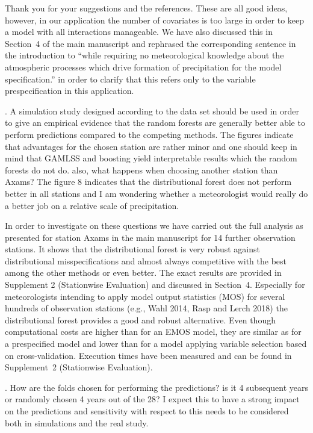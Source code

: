 \documentclass[american,foldmarks=false,noconfig]{uibklttr}
\newenvironment{review}{\fontshape{\itdefault}\fontseries{\bfdefault} \selectfont \smallskip}{\par}
\begin{document}
Thank you for your suggestions and the references. These are all
good ideas, however, in our application the number of covariates
is too large in order to keep a model with all interactions manageable.
We have also discussed this in Section~4 of the main manuscript and
rephrased the corresponding sentence in the introduction to ``while 
requiring no meteorological knowledge about the atmospheric processes 
which drive formation of precipitation for the model specification.'' 
in order to clarify that this refers only to the variable prespecification 
in this application.


\begin{review}
6. A simulation study designed according to the data set should 
be used in order to give an empirical evidence that the random 
forests are generally better able to perform predictions compared 
to the competing methods. The figures indicate that advantages 
for the chosen station are rather minor and one should keep in 
mind that GAMLSS and boosting yield interpretable results which 
the random forests do not do. also, what happens when choosing 
another station than Axams? The figure 8 indicates that the 
distributional forest does not perform better in all stations 
and I am wondering whether a meteorologist would really do a 
better job on a relative scale of precipitation.
\end{review}

In order to investigate on these questions we have carried out the full
analysis as presented for station Axams in the main manuscript for 14
further observation stations. It shows that the distributional
forest is very robust against distributional misspecifications
and almost always competitive with the best among the other methods 
or even better. The exact results are provided in 
Supplement 2 (Stationwise Evaluation) and discussed in Section~4. 
Especially for meteorologists intending to apply model output 
statistics (MOS) for several hundreds of observation stations 
(e.g., Wahl 2014, Rasp and Lerch 2018)
the distributional forest provides a good and robust alternative. 
Even though computational costs are higher than for an EMOS model, 
they are similar as for a prespecified model and lower than for 
a model applying variable selection based on cross-validation.
Execution times have been measured and can be found
in Supplement~2 (Stationwise Evaluation).



\begin{review}
7. How are the folds chosen for performing the predictions? 
is it 4 subsequent years or randomly chosen 4 years out of 
the 28? I expect this to have a strong impact on the predictions 
and sensitivity with respect to this needs to be considered both 
in simulations and the real study.
\end{review}
\end{document}
